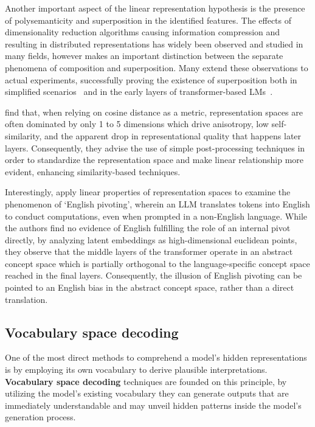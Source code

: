 Another important aspect of the linear representation hypothesis is the presence of polysemanticity and superposition in the identified features.
The effects of dimensionality reduction algorithms causing information compression and resulting in distributed representations has widely been observed and studied in many fields, however \citet{olah2023} makes an important distinction between the separate phenomena of composition and superposition.
Many extend these observations to actual experiments, successfully proving the existence of superposition both in simplified scenarios~\cite{elhage2022} and in the early layers of transformer-based LMs~\cite{gurnee2023}.

\citet{timkey2021} find that, when relying on cosine distance as a metric, representation spaces are often dominated by only 1 to 5 dimensions which drive anisotropy, low self-similarity, and the apparent drop in representational quality that happens later layers.
Consequently, they advise the use of simple post-processing techniques in order to standardize the representation space and make linear relationship more evident, enhancing similarity-based techniques.

Interestingly, \citet{wendler2024} apply linear properties of representation spaces to examine the phenomenon of `English pivoting', wherein an LLM translates tokens into English to conduct computations, even when prompted in a non-English language.
While the authors find no evidence of English fulfilling the role of an internal pivot directly, by analyzing latent embeddings as high-dimensional euclidean points, they observe that the middle layers of the transformer operate in an abstract concept space which is partially orthogonal to the language-specific concept space reached in the final layers.
Consequently, the illusion of English pivoting can be pointed to an English bias in the abstract concept space, rather than a direct translation.

\subsection{Vocabulary space decoding}\label{ssec:related_vocab}

One of the most direct methods to comprehend a model's hidden representations is by employing its own vocabulary to derive plausible interpretations. \textbf{Vocabulary space decoding} techniques are founded on this principle, by utilizing the model's existing vocabulary they can generate outputs that are immediately understandable and may unveil hidden patterns inside the model's generation process.

